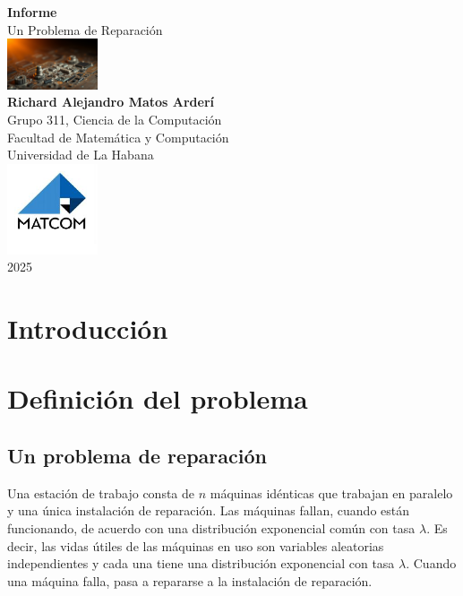 \documentclass[a4paper, 12pt]{article}
\begin{document}
\graphicspath{{./}}

\begin{titlepage}
    \centering
    \vspace*{2cm}
    {\huge\bfseries Informe\\[0.4cm]}
    {\LARGE Un Problema de Reparación \\}
    \vspace*{2cm}
    \includegraphics[width=0.2\textwidth, height=0.2\textheight]{Images/Presentacion.png}\\[0.5cm]
   
    {\Large \textbf{Richard Alejandro Matos Arderí}\\[0.5cm]}
    {\Large Grupo 311, Ciencia de la Computación\\[0.5cm]}
    {\Large Facultad de Matemática y Computación\\[0.5cm]}
    {\Large Universidad de La Habana\\[0.5cm]}
    \vfill
    \includegraphics[width=0.2\textwidth, height=0.2\textheight]{Images/MATCOM.jpg}\\[0.5cm]
    {\Large 2025}
\end{titlepage}

\newpage
\tableofcontents
\newpage


\section{Introducción}

\section{Definición del problema}
\subsection{Un problema de reparación}

Una estación de trabajo consta de $n$ máquinas idénticas que trabajan en paralelo y una única instalación de reparación. Las máquinas fallan, cuando están funcionando, de acuerdo con una distribución exponencial común con tasa $\lambda$. Es decir, las vidas útiles de las máquinas en uso son variables aleatorias independientes y cada una tiene una distribución exponencial con tasa $\lambda$. Cuando una máquina falla, pasa a repararse a la instalación de reparación.
\end{document}
